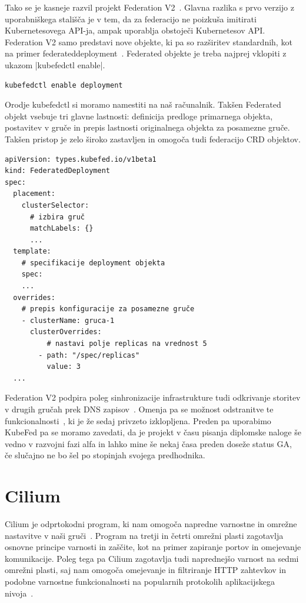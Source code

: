 \documentclass[a4paper, 12pt]{book}
\begin{document}
Tako se je kasneje razvil projekt Federation V2~\cite{kubernetes-federation-evolution}.
Glavna razlika s prvo verzijo z uporabniškega stališča je v tem, da za federacijo ne poizkuša imitirati Kubernetesovega API-ja, ampak uporablja obstoječi Kubernetesov API. 
Federation V2 samo predstavi nove objekte, ki pa so razširitev standardnih, kot na primer federateddeployment~\cite{kubefed-userguide}.
Federated objekte je treba najprej vklopiti z ukazom \spverb|kubefedctl enable|.
\begin{verbatim}
kubefedctl enable deployment
\end{verbatim}
Orodje kubefedctl si moramo namestiti na naš računalnik.
Takšen Federated objekt vsebuje tri glavne lastnosti: definicija predloge primarnega objekta, postavitev v gruče in prepis lastnosti originalnega objekta za posamezne gruče.
Takšen pristop je zelo široko zastavljen in omogoča tudi federacijo CRD objektov.
\begin{verbatim}
apiVersion: types.kubefed.io/v1beta1
kind: FederatedDeployment
spec:
  placement:
    clusterSelector:
      # izbira gruč
      matchLabels: {}
      ... 
  template:
    # specifikacije deployment objekta
    spec:
    ... 
  overrides:
    # prepis konfiguracije za posamezne gruče
    - clusterName: gruca-1
      clusterOverrides:
          # nastavi polje replicas na vrednost 5
        - path: "/spec/replicas"
          value: 3
  ... 
\end{verbatim}
Federation V2 podpira poleg sinhronizacije infrastrukture tudi odkrivanje storitev v drugih gručah prek DNS zapisov~\cite{kubefed-userguide}.
Omenja pa se možnost odstranitve te funkcionalnosti~\cite{remove-service-discovery}, ki je že sedaj privzeto izklopljena.
Preden pa uporabimo KubeFed pa se moramo zavedati, da je projekt v času pisanja diplomske naloge še vedno v razvojni fazi alfa in lahko mine še nekaj časa preden doseže status GA, če slučajno ne bo šel po stopinjah svojega predhodnika.
\section{Cilium}
Cilium je odprtokodni program, ki nam omogoča napredne varnostne in omrežne nastavitve v naši gruči~\cite{cilium-intro}.
Program na tretji in četrti omrežni plasti zagotavlja osnovne principe varnosti in zaščite, kot na primer zapiranje portov in omejevanje komunikacije.
Poleg tega pa Cilium zagotavlja tudi naprednejšo varnost na sedmi omrežni plasti, saj nam omogoča omejevanje in filtriranje HTTP zahtevkov in podobne varnostne funkcionalnosti na popularnih protokolih aplikacijskega nivoja~\cite{cilium-intro}.
\end{document}
